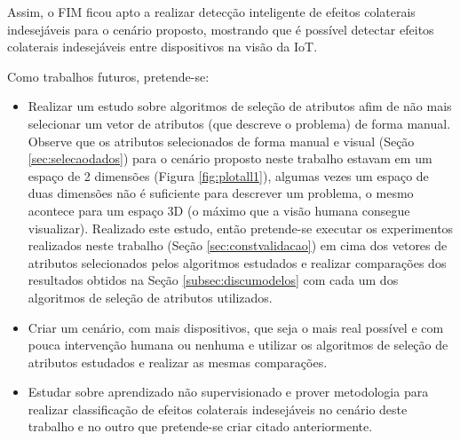 Assim, o FIM ficou apto a realizar detecção inteligente de efeitos colaterais indesejáveis para o cenário proposto, mostrando que é possível detectar efeitos colaterais indesejáveis entre dispositivos na visão da IoT.

Como trabalhos futuros, pretende-se:
\begin{itemize}
\item Realizar um estudo sobre algoritmos de seleção de atributos afim de não mais selecionar um vetor de atributos (que descreve o problema) de forma manual. Observe que os atributos selecionados de forma manual e visual (Seção \ref{sec:selecaodados}) para o cenário proposto neste trabalho estavam em um espaço de 2 dimensões (Figura \ref{fig:plotall1}), algumas vezes um espaço de duas dimensões não é suficiente para descrever um problema, o mesmo acontece para um espaço 3D (o máximo que a visão humana consegue visualizar). Realizado este estudo, então pretende-se executar os experimentos realizados neste trabalho (Seção \ref{sec:constvalidacao}) em cima dos vetores de atributos selecionados pelos algoritmos estudados e realizar comparações dos resultados obtidos na Seção \ref {subsec:discumodelos} com cada um dos algoritmos de seleção de atributos utilizados.
\item Criar um cenário, com mais dispositivos, que seja o mais real possível e com pouca intervenção humana ou nenhuma e utilizar os algoritmos de seleção de atributos estudados e realizar as mesmas comparações.
\item Estudar sobre aprendizado não supervisionado e prover metodologia para realizar classificação de efeitos colaterais indesejáveis no cenário deste trabalho e no outro que pretende-se criar citado anteriormente.
\end{itemize}
